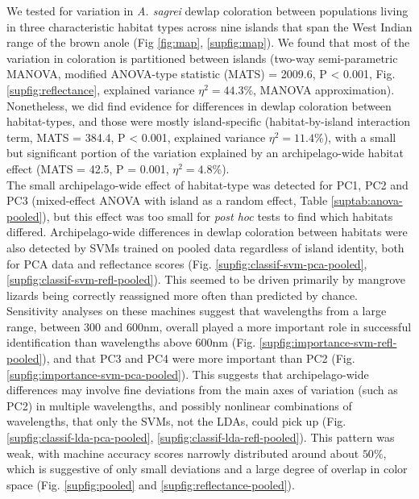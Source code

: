 
We tested for variation in \textit{A. sagrei} dewlap coloration between populations living in three characteristic habitat types across nine islands that span the West Indian range of the brown anole (Fig \ref{fig:map}, \ref{supfig:map}). We found that most of the variation in coloration is partitioned between islands (two-way semi-parametric MANOVA, modified ANOVA-type statistic (MATS) = 2009.6, P < 0.001, Fig. \ref{supfig:reflectance}, explained variance $\eta^2 = 44.3$\%, MANOVA approximation). Nonetheless, we did find evidence for differences in dewlap coloration between habitat-types, and those were mostly island-specific (habitat-by-island interaction term, MATS = 384.4, P < 0.001, explained variance $\eta^2 = 11.4$\%), with a small but significant portion of the variation explained by an archipelago-wide habitat effect (MATS = 42.5, P = 0.001, $\eta^2 = 4.8$\%).\\

The small archipelago-wide effect of habitat-type was detected for PC1, PC2 and PC3 (mixed-effect ANOVA with island as a random effect, Table \ref{suptab:anova-pooled}), but this effect was too small for \textit{post hoc} tests to find which habitats differed. Archipelago-wide differences in dewlap coloration between habitats were also detected by SVMs trained on pooled data regardless of island identity, both for PCA data and reflectance scores (Fig. \ref{supfig:classif-svm-pca-pooled}, \ref{supfig:classif-svm-refl-pooled}). This seemed to be driven primarily by mangrove lizards being correctly reassigned more often than predicted by chance. Sensitivity analyses on these machines suggest that wavelengths from a large range, between 300 and 600nm, overall played a more important role in successful identification than wavelengths above 600nm (Fig. \ref{supfig:importance-svm-refl-pooled}), and that PC3 and PC4 were more important than PC2 (Fig. \ref{supfig:importance-svm-pca-pooled}). This suggests that archipelago-wide differences may involve fine deviations from the main axes of variation (such as PC2) in multiple wavelengths, and possibly nonlinear combinations of wavelengths, that only the SVMs, not the LDAs, could pick up (Fig. \ref{supfig:classif-lda-pca-pooled}, \ref{supfig:classif-lda-refl-pooled}). This pattern was weak, with machine accuracy scores narrowly distributed around about $50\%$, which is suggestive of only small deviations and a large degree of overlap in color space (Fig. \ref{supfig:pooled} and \ref{supfig:reflectance-pooled}).\\

